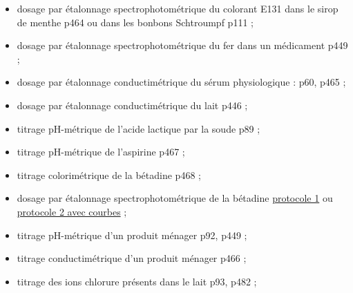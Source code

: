 \begin{funfact}
\begin{itemize}
\item dosage par étalonnage spectrophotométrique du colorant E131 dans le sirop de menthe \cite{Dulaurans2012} p464 ou dans les bonbons Schtroumpf \cite{Prevost2012} p111 ;
\item dosage par étalonnage spectrophotométrique du fer dans un médicament \cite{Prevost2012} p449 ;
\item dosage par étalonnage conductimétrique du sérum physiologique : \cite{Antczak2020} p60, \cite{Dulaurans2012} p465 ;
\item dosage par étalonnage conductimétrique du lait \cite{Prevost2012} p446 ;
\item titrage pH-métrique de l'acide lactique par la soude \cite{Antczak2020} p89 ;
\item titrage pH-métrique de l'aspirine \cite{Dulaurans2012} p467 ;
\item titrage colorimétrique de la bétadine \cite{Dulaurans2012} p468 ;
\item dosage par étalonnage spectrophotométrique de la bétadine \href{https://www.google.com/url?sa=t&rct=j&q=&esrc=s&source=web&cd=1&cad=rja&uact=8&ved=2ahUKEwiz1aDtwr_pAhWLohQKHVTACOwQFjAAegQIARAB&url=https\%3A\%2F\%2Fecebac.fr\%2Fcorriges\%2FECE_18_PC_44_f638b07a9c.pdf&usg=AOvVaw2PpxDP0mSmk76nrw4TAFnL}{protocole 1} ou \href{https://www.google.com/url?sa=t&rct=j&q=&esrc=s&source=web&cd=3&cad=rja&uact=8&ved=2ahUKEwiX1umml8DpAhVrxYUKHccoBeoQFjACegQIAxAB&url=https\%3A\%2F\%2Fphysiquelevavasseur.jimdofree.com\%2Fapp\%2Fdownload\%2F6817364013\%2Fcorrection\%2BTP\%2Bn\%25C2\%25B02\%2BLe\%2Bdosage\%2Bpar\%2B\%25C3\%25A9talonnage\%2Bspectrophotom\%25C3\%25A9trique-Corrig\%25C3\%25A9.pdf\%3Ft\%3D1568184708&usg=AOvVaw0GoXYVACltYyetD0MZWvA1}{protocole 2 avec courbes} ;
\item titrage pH-métrique d'un produit ménager \cite{Antczak2020} p92, \cite{Prevost2012} p449 ;
\item titrage conductimétrique d'un produit ménager \cite{Dulaurans2012} p466 ;
\item titrage des ions chlorure présents dans le lait \cite{Antczak2020} p93, \cite{Dulaurans2012} p482 ;
\end{itemize}
\end{funfact}

\newpage